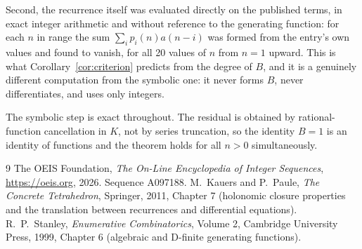 \documentclass[11pt,a4paper]{article}
\theoremstyle{plain}
\theoremstyle{definition}
\begin{document}
Second, the recurrence itself was evaluated directly on the published terms, in exact
integer arithmetic and without reference to the generating function: for each $n$ in range
the sum $\sum_{i}p_{i}(n)a(n-i)$ was formed from the entry's own values and found to
vanish, for all 20 values of $n$ from $n=1$ upward. This is what
Corollary~\ref{cor:criterion} predicts from the degree of $B$, and it is a genuinely
different computation from the symbolic one: it never forms $B$, never differentiates, and
uses only integers.

The symbolic step is exact throughout. The residual is obtained by rational-function
cancellation in $K$, not by series truncation, so the identity $B=1$ is an
identity of functions and the theorem holds for all $n>0$ simultaneously.

\begin{thebibliography}{9}
 The OEIS Foundation, \emph{The On-Line Encyclopedia of Integer Sequences},
\url{https://oeis.org}, 2026. Sequence A097188.
 M.~Kauers and P.~Paule, \emph{The Concrete Tetrahedron}, Springer, 2011,
Chapter 7 (holonomic closure properties and the translation between recurrences and
differential equations).
 R.~P.~Stanley, \emph{Enumerative Combinatorics}, Volume 2, Cambridge
University Press, 1999, Chapter 6 (algebraic and D-finite generating functions).
\end{thebibliography}
\end{document}
